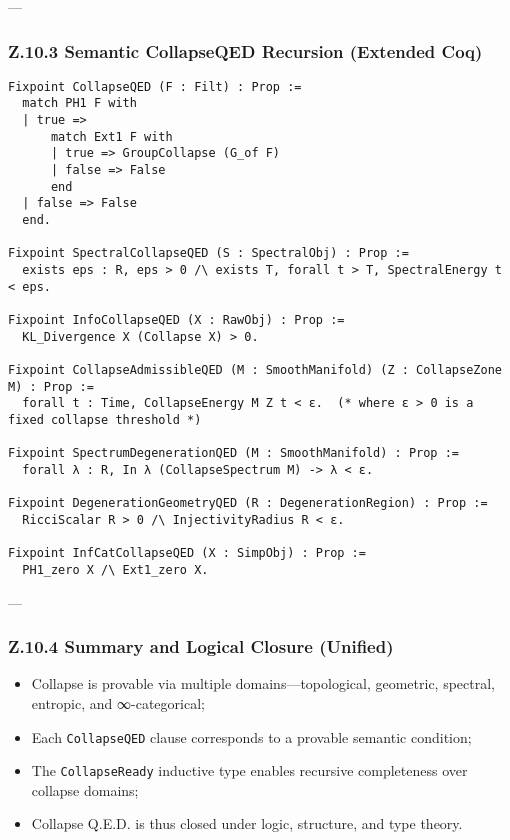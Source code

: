 \documentclass[11pt]{article}
\begin{document}
---

\subsubsection*{Z.10.3 Semantic CollapseQED Recursion (Extended Coq)}

\begin{lstlisting}[language=Coq, mathescape=false]
Fixpoint CollapseQED (F : Filt) : Prop :=
  match PH1 F with
  | true =>
      match Ext1 F with
      | true => GroupCollapse (G_of F)
      | false => False
      end
  | false => False
  end.

Fixpoint SpectralCollapseQED (S : SpectralObj) : Prop :=
  exists eps : R, eps > 0 /\ exists T, forall t > T, SpectralEnergy t < eps.

Fixpoint InfoCollapseQED (X : RawObj) : Prop :=
  KL_Divergence X (Collapse X) > 0.

Fixpoint CollapseAdmissibleQED (M : SmoothManifold) (Z : CollapseZone M) : Prop :=
  forall t : Time, CollapseEnergy M Z t < ε.  (* where ε > 0 is a fixed collapse threshold *)

Fixpoint SpectrumDegenerationQED (M : SmoothManifold) : Prop :=
  forall λ : R, In λ (CollapseSpectrum M) -> λ < ε.

Fixpoint DegenerationGeometryQED (R : DegenerationRegion) : Prop :=
  RicciScalar R > 0 /\ InjectivityRadius R < ε.

Fixpoint InfCatCollapseQED (X : SimpObj) : Prop :=
  PH1_zero X /\ Ext1_zero X.
\end{lstlisting}

---

\subsubsection*{Z.10.4 Summary and Logical Closure (Unified)}

\begin{itemize}
  \item Collapse is provable via multiple domains—topological, geometric, spectral, entropic, and ∞-categorical;
  \item Each \texttt{CollapseQED} clause corresponds to a provable semantic condition;
  \item The \texttt{CollapseReady} inductive type enables recursive completeness over collapse domains;
  \item Collapse Q.E.D. is thus closed under logic, structure, and type theory.
\end{itemize}
\end{document}
